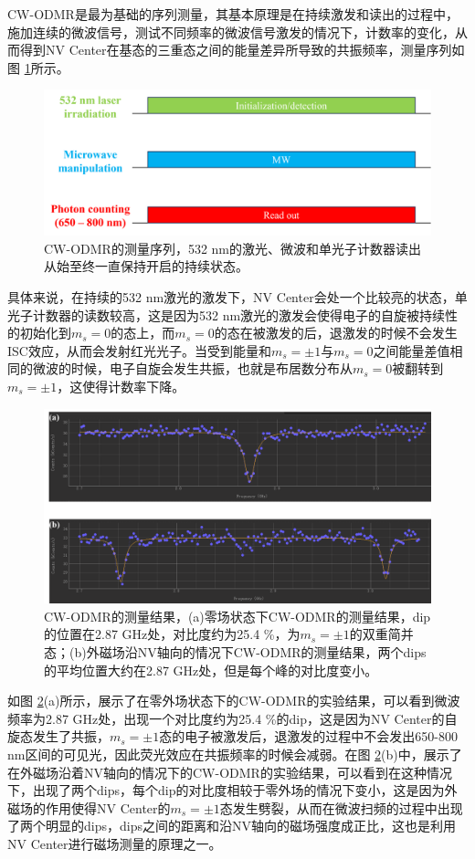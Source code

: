\documentclass[type = bachelor, oneside]{whu-thesis}
\begin{document}
CW-ODMR是最为基础的序列测量，其基本原理是在持续激发和读出的过程中，施加连续的微波信号，测试不同频率的微波信号激发的情况下，计数率的变化，从而得到NV Center在基态的三重态之间的能量差异所导致的共振频率，测量序列如图 \ref{fig: CW-ODMR_seq}所示。
\begin{figure}
  \centering
  \includegraphics[width=1.0\textwidth]{figures/Chapter 2/CW-ODMR_seq.png}
  \caption[CW-ODMR的测量序列]{CW-ODMR的测量序列，532 nm的激光、微波和单光子计数器读出从始至终一直保持开启的持续状态。}
  \label{fig: CW-ODMR_seq}
\end{figure}
具体来说，在持续的532 nm激光的激发下，NV Center会处一个比较亮的状态，单光子计数器的读数较高，这是因为532 nm激光的激发会使得电子的自旋被持续性的初始化到$m_s=0$的态上，而$m_s=0$的态在被激发的后，退激发的时候不会发生ISC效应，从而会发射红光光子。当受到能量和$m_s=\pm1$与$m_s=0$之间能量差值相同的微波的时候，电子自旋会发生共振，也就是布居数分布从$m_s=0$被翻转到$m_s=\pm1$，这使得计数率下降。
\begin{figure}
  \centering
  \includegraphics[width=1.0\textwidth]{figures/Chapter 2/CW-ODMR_results.png}
  \caption[CW-ODMR的测量结果]{CW-ODMR的测量结果，(a)零场状态下CW-ODMR的测量结果，dip的位置在2.87 GHz处，对比度约为25.4 \%，为$m_s=\pm1$的双重简并态；(b)外磁场沿NV轴向的情况下CW-ODMR的测量结果，两个dips的平均位置大约在2.87 GHz处，但是每个峰的对比度变小。}
  \label{fig: CW-ODMR_results}
\end{figure}
如图 \ref{fig: CW-ODMR_results}(a)所示，展示了在零外场状态下的CW-ODMR的实验结果，可以看到微波频率为2.87 GHz处，出现一个对比度约为25.4 \%的dip，这是因为NV Center的自旋态发生了共振，$m_s=\pm1$态的电子被激发后，退激发的过程中不会发出650-800 nm区间的可见光，因此荧光效应在共振频率的时候会减弱。在图 \ref{fig: CW-ODMR_results}(b)中，展示了在外磁场沿着NV轴向的情况下的CW-ODMR的实验结果，可以看到在这种情况下，出现了两个dips，每个dip的对比度相较于零外场的情况下变小，这是因为外磁场的作用使得NV Center的$m_s=\pm1$态发生劈裂，从而在微波扫频的过程中出现了两个明显的dips，dips之间的距离和沿NV轴向的磁场强度成正比，这也是利用NV Center进行磁场测量的原理之一。
\end{document}
